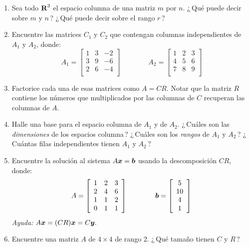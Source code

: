 \documentclass[12pt,a4paper]{article}
\newcommand{\bi}[1]{\hbox{\boldmath$#1$}}
\newcommand\1{\mbox{\,\vrule height-0.8pt depth1.0pt width2pc\,}}
\newcommand\2{\mbox{\,\vrule height-0.8pt depth1.0pt width1pc\,}}
\begin{document}
\begin{enumerate}
\item Sea todo $\hbox{\textbf{R}}^3$ el espacio columna de una matriz $m$ por $n$. ¿\,Qué puede decir sobre $m$ y $n$\,? ¿\,Qué puede decir sobre el rango $r$\,?

\item Encuentre las matrices $C_{1}$ y $C_{2}$ que contengan columnas independientes de $A_{1}$ y $A_{2}$, donde:
$$
A_1=\left[\begin{array}{rrr}1&3&-2\\3&9&-6\\2&6&-4\\\end{array}\right]\qquad\qquad A_2=\left[\begin{array}{rrr}1&2&3\\4&5&6\\7&8&9\\\end{array}\right]
$$

\item Factorice cada una de esas matrices como $A=CR$. Notar que la matriz $R$ contiene los números que multiplicados por las columnas de $C$ recuperan las columnas de $A$.



\item Halle una base para el espacio columna de $A_{1}$ y de $A_{2}$. ¿\,Cuáles son las {\it dimensiones} de los espacios columna\,? ¿\,Cuáles son los {\it rangos} de $A_{1}$ y $A_{2}$\,? ¿\,Cuántas filas independientes tienen $A_{1}$ y $A_{2}$\,?

\item Encuentre la solución al sistema  $A\bi{x}=\bi{b}$ usando la descomposición $CR$, donde: 
$$
A=\left[\begin{array}{rrr}1&2&3\\2&4&6\\1&1&2\\0&1&1\\\end{array}\right]\qquad\qquad \bi{b}=\left[\begin{array}{c}5\\10\\4\\1\\\end{array}\right]
$$
\textit{Ayuda:} $A\bi{x} = (CR)\bi{x} = C\bi{y}.$


\item Encuentre una matriz $A$ de $4\times 4$ de rango 2. ¿\,Qué tamaño tienen $C$ y $R$\,?


\end{enumerate}
\end{document}
